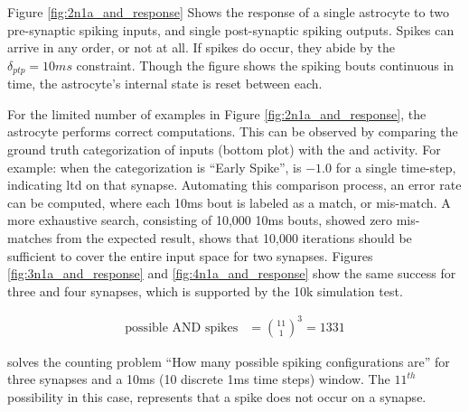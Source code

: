 Figure \ref{fig:2n1a_and_response} Shows the response of a single astrocyte to
two pre-synaptic spiking inputs, and single post-synaptic spiking outputs. Spikes
can arrive in any order, or not at all. If spikes do occur, they abide by the
$\delta_{ptp}=10ms$ constraint. Though the figure shows the spiking bouts
continuous in time, the astrocyte's internal state is reset between each.


For the limited number of examples in Figure \ref{fig:2n1a_and_response}, the
astrocyte performs correct computations. This can be observed by comparing the
ground truth categorization of inputs (bottom plot) with the \dser and \serca
activity. For example: when the categorization is ``Early Spike'', \dser is $-1.0$ for a
single time-step, indicating \gls{ltd} on that synapse. Automating this comparison
process, an error rate can be computed, where each 10ms bout is labeled as a
match, or mis-match. A more exhaustive search, consisting
of 10,000 10ms bouts, showed zero mis-matches from the expected result,
 shows that 10,000 iterations should be sufficient to
cover the entire input space for two synapses. Figures
\ref{fig:3n1a_and_response} and \ref{fig:4n1a_and_response} show the same success
for three and four synapses, which is supported by the 10k simulation test.

\begin{align}
  \textrm{possible AND spikes} &= \binom{11}{1}^3 = 1331 \label{eq:astro_2syn_exaust}
\end{align}

 solves the counting problem ``How many
possible spiking configurations are'' for three synapses and a 10ms (10 discrete
1ms time steps) window. The $11^{th}$ possibility in this case, represents that a
spike does not occur on a synapse.



